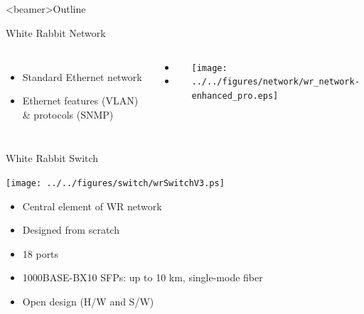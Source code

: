 \documentclass[compress,red]{beamer}
\begin{document}
\subsection{}
\begin{frame}<beamer>{Outline}
    \tableofcontents [currentsection]
\end{frame}

\begin{frame}{White Rabbit Network}


\begin{columns}[c]
 
  \begin{itemize}
      \item Standard Ethernet network
      \item Ethernet features (VLAN) \& protocols (SNMP)
    \end{itemize}
    \begin{itemize}
      \item \color{Blue}{High accuracy synchronization}
      \item \color{Red}{Reliable and low-latency Control Data}
  \end{itemize}

    \begin{center}
    \texttt{[image: ../../figures/network/wr\_network-enhanced\_pro.eps]}
    \end{center}
\end{columns}

\end{frame}

\begin{frame}{White Rabbit Switch }

    \begin{center}
    \texttt{[image: ../../figures/switch/wrSwitchV3.ps]}
    \end{center}

	\begin{itemize}
	\item Central element of WR network
	\item Designed from scratch
	\item 18 ports
	\item 1000BASE-BX10 SFPs: up to 10 km, single-mode fiber
	\item Open design (H/W and S/W)
	\end{itemize}
\end{frame}
\end{document}
